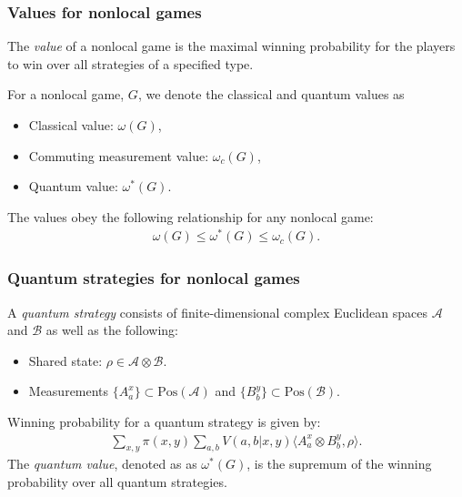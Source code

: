 \documentclass{beamer}
\newcommand{\bigip}[2]{\bigl\langle #1, #2 \bigr\rangle}
\def\A{\mathcal{A}}
\def\B{\mathcal{B}}
\newcommand{\setft}[1]{\mathrm{#1}}
\newcommand{\Pos}{\setft{Pos}}
\begin{document}
\begin{frame}
	\frametitle{Values for nonlocal games}
	The \emph{value} of a nonlocal game is the maximal winning probability for the players to win over all strategies of a specified type. 
	\vspace{2mm}
	
For a nonlocal game, $G$, we denote the classical and quantum values as 
	\begin{itemize}
		\item Classical value: $\omega(G)$,
		\item Commuting measurement value: $\omega_c(G)$,
		\item Quantum value: $\omega^*(G)$.
	\end{itemize}	
	\vspace{2mm}
	
	The values obey the following relationship for any nonlocal game:
	\begin{align*}
		\omega(G) \leq \omega^*(G) \leq \omega_c(G).
	\end{align*}
\end{frame}

\begin{frame}
	\frametitle{Quantum strategies for nonlocal games}
	A \emph{quantum strategy} consists of finite-dimensional complex Euclidean spaces $\A$ and $\B$ as well as the following:
	\begin{itemize}
		\item Shared state: $\rho \in \A \otimes \B$.
		\item Measurements $\{A^x_a\} \subset \Pos(\A)$ and $\{B_b^y\} \subset \Pos(\B)$.
	\end{itemize}
	\pause 
	\vspace{5mm}
	Winning probability for a quantum strategy is given by:
	\begin{align*}
		\sum_{x,y} \pi(x,y) \sum_{a,b} V(a,b|x,y) \bigip{A_a^x \otimes B_b^y}{\rho}.
	\end{align*}
	The \emph{quantum value}, denoted as as $\omega^*(G)$, is the supremum of the winning probability over all quantum strategies. 
\end{frame}
\end{document}
